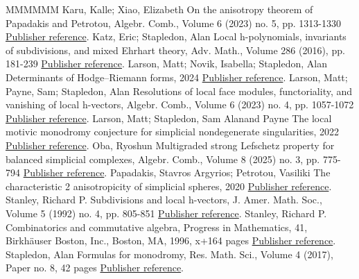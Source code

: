 \documentclass[11pt]{article}
\theoremstyle{definition}
\numberwithin{equation}{section}
\numberwithin{equation}{section}
\begin{document}
\begin{thebibliography}{MMMMMM}
 Karu, Kalle; Xiao, Elizabeth On the anisotropy theorem of Papadakis and Petrotou, Algebr. Comb., Volume 6 (2023) no. 5, pp. 1313-1330 \href{https://alco.centre-mersenne.org/articles/10.5802/alco.453/#KaruXiao}{Publisher reference}.
 Katz, Eric; Stapledon, Alan Local h-polynomials, invariants of subdivisions, and mixed Ehrhart theory, Adv. Math., Volume 286 (2016), pp. 181-239 \href{https://alco.centre-mersenne.org/articles/10.5802/alco.453/#KatzStapledon16}{Publisher reference}.
 Larson, Matt; Novik, Isabella; Stapledon, Alan Determinants of Hodge–Riemann forms, 2024 \href{https://alco.centre-mersenne.org/articles/10.5802/alco.453/#LNS}{Publisher reference}.
 Larson, Matt; Payne, Sam; Stapledon, Alan Resolutions of local face modules, functoriality, and vanishing of local h-vectors, Algebr. Comb., Volume 6 (2023) no. 4, pp. 1057-1072 \href{https://alco.centre-mersenne.org/articles/10.5802/alco.453/#LPS1}{Publisher reference}.
 Larson, Matt; Stapledon, Sam Alanand Payne The local motivic monodromy conjecture for simplicial nondegenerate singularities, 2022 \href{https://alco.centre-mersenne.org/articles/10.5802/alco.453/#LPS2}{Publisher reference}.
 Oba, Ryoshun Multigraded strong Lefschetz property for balanced simplicial complexes, Algebr. Comb., Volume 8 (2025) no. 3, pp. 775-794 \href{https://alco.centre-mersenne.org/articles/10.5802/alco.453/#Oba}{Publisher reference}.
 Papadakis, Stavros Argyrios; Petrotou, Vasiliki The characteristic 2 anisotropicity of simplicial spheres, 2020 \href{https://alco.centre-mersenne.org/articles/10.5802/alco.453/#PapadakisPetrotoug}{Publisher reference}.
 Stanley, Richard P. Subdivisions and local h-vectors, J. Amer. Math. Soc., Volume 5 (1992) no. 4, pp. 805-851 \href{https://alco.centre-mersenne.org/articles/10.5802/alco.453/#Stanleylocalh}{Publisher reference}.
 Stanley, Richard P. Combinatorics and commutative algebra, Progress in Mathematics, 41, Birkhäuser Boston, Inc., Boston, MA, 1996, x+164 pages \href{https://alco.centre-mersenne.org/articles/10.5802/alco.453/#Stanleybook}{Publisher reference}.
 Stapledon, Alan Formulas for monodromy, Res. Math. Sci., Volume 4 (2017), Paper no. 8, 42 pages \href{https://alco.centre-mersenne.org/articles/10.5802/alco.453/#Stapledon17}{Publisher reference}.
\end{thebibliography}
\end{document}
